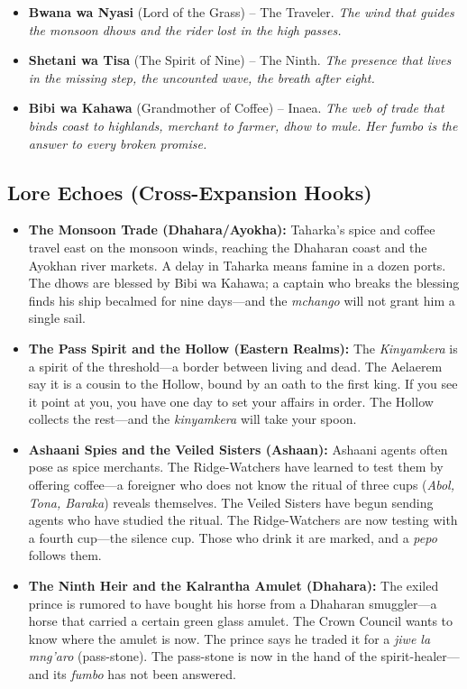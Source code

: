 \begin{itemize}
\begin{itemize}
    \item \textbf{Bwana wa Nyasi} (Lord of the Grass) -- The Traveler. \textit{The wind that guides the monsoon dhows and the rider lost in the high passes.}
    \item \textbf{Shetani wa Tisa} (The Spirit of Nine) -- The Ninth. \textit{The presence that lives in the missing step, the uncounted wave, the breath after eight.}
    \item \textbf{Bibi wa Kahawa} (Grandmother of Coffee) -- Inaea. \textit{The web of trade that binds coast to highlands, merchant to farmer, dhow to mule. Her \textit{fumbo} is the answer to every broken promise.}
  \end{itemize}
\end{itemize}

\subsection{Lore Echoes (Cross-Expansion Hooks)}
\begin{itemize}
  \item \textbf{The Monsoon Trade (Dhahara/Ayokha):} Taharka's spice and coffee travel east on the monsoon winds, reaching the Dhaharan coast and the Ayokhan river markets. A delay in Taharka means famine in a dozen ports. The dhows are blessed by Bibi wa Kahawa; a captain who breaks the blessing finds his ship becalmed for nine days---and the \textit{mchango} will not grant him a single sail.
  \item \textbf{The Pass Spirit and the Hollow (Eastern Realms):} The \textit{Kinyamkera} is a spirit of the threshold---a border between living and dead. The Aelaerem say it is a cousin to the Hollow, bound by an oath to the first king. If you see it point at you, you have one day to set your affairs in order. The Hollow collects the rest---and the \textit{kinyamkera} will take your spoon.
  \item \textbf{Ashaani Spies and the Veiled Sisters (Ashaan):} Ashaani agents often pose as spice merchants. The Ridge-Watchers have learned to test them by offering coffee---a foreigner who does not know the ritual of three cups (\textit{Abol, Tona, Baraka}) reveals themselves. The Veiled Sisters have begun sending agents who have studied the ritual. The Ridge-Watchers are now testing with a fourth cup---the silence cup. Those who drink it are marked, and a \textit{pepo} follows them.
  \item \textbf{The Ninth Heir and the Kalrantha Amulet (Dhahara):} The exiled prince is rumored to have bought his horse from a Dhaharan smuggler---a horse that carried a certain green glass amulet. The Crown Council wants to know where the amulet is now. The prince says he traded it for a \textit{jiwe la mng'aro} (pass-stone). The pass-stone is now in the hand of the spirit-healer---and its \textit{fumbo} has not been answered.
\end{itemize}

